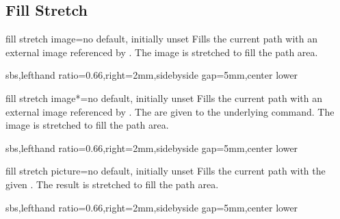 \documentclass{article}
\newenvironment{dispExample*}[1]{\par}{}
\begin{document}
\clearpage
\subsection{Fill Stretch}
\begin{docTikzKey}{fill stretch image}{=}{no default, initially unset}
  Fills the current path with an external image referenced by .
  The image is stretched to fill the path area.
\begin{dispExample*}{sbs,lefthand ratio=0.66,right=2mm,sidebyside gap=5mm,center lower}
\end{dispExample*}
\end{docTikzKey}


\begin{docTikzKey}{fill stretch image*}{=}{no default, initially unset}
  Fills the current path with an external image referenced by .
  The  are given to the underlying  command.
  The image is stretched to fill the path area.
\begin{dispExample*}{sbs,lefthand ratio=0.66,right=2mm,sidebyside gap=5mm,center lower}
\end{dispExample*}
\end{docTikzKey}


\begin{docTikzKey}{fill stretch picture}{=}{no default, initially unset}
  Fills the current path with the given .
  The result is stretched to fill the path area.
\begin{dispExample*}{sbs,lefthand ratio=0.66,right=2mm,sidebyside gap=5mm,center lower}
\end{dispExample*}
\end{docTikzKey}
\end{document}
